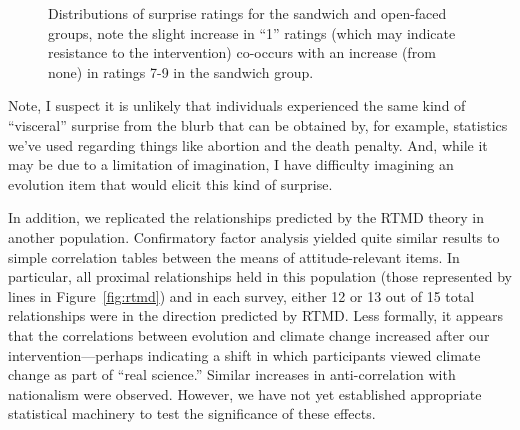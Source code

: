 \begin{figure}[h]
\centering
{}
\caption{Distributions of surprise ratings for the sandwich and open-faced
groups, note the slight increase in ``1'' ratings (which may indicate resistance
to the intervention) co-occurs with an increase (from none) in ratings 7-9 in
the sandwich group.}
\end{figure}

Note, I suspect it is unlikely that individuals experienced the same kind of
``visceral'' surprise from the blurb that can be obtained by, for example,
statistics we've used regarding things like abortion and the death penalty. And,
while it may be due to a limitation of imagination, I have difficulty imagining
an evolution item that would elicit this kind of surprise.

In addition, we replicated the relationships predicted by the RTMD theory in
another population. Confirmatory factor analysis yielded quite similar results
to simple correlation tables between the means of attitude-relevant items. In
particular, all proximal relationships held in this population (those
represented by lines in Figure~\ref{fig:rtmd}) and in each survey, either 12 or
13 out of 15 total relationships were in the direction predicted by RTMD. Less
formally, it appears that the correlations between evolution and climate change
increased after our intervention---perhaps indicating a shift in which
participants viewed climate change as part of ``real science.'' Similar
increases in anti-correlation with nationalism were observed. However, we have
not yet established appropriate statistical machinery to test the significance
of these effects.

